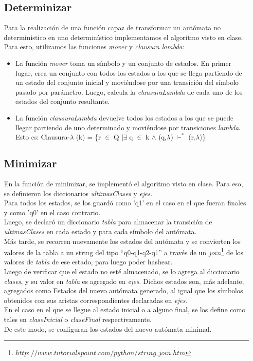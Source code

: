 \documentclass[a4paper, 10pt, twoside]{article}
\begin{document}
\subsection{Determinizar}
Para la realización de una función capaz de transformar un autómata no determinístico en uno determinístico implementamos el algoritmo visto en clase. Para esto, utilizamos las funciones \textit{mover} y \textit{clausura lambda}:
\begin{itemize}
\item La función \textit{mover} toma un símbolo y un conjunto de estados. En primer lugar, crea un conjunto con todos los estados a los que se llega partiendo de un estado del conjunto inicial y moviéndose por una transición del símbolo pasado por parámetro. Luego, calcula la \textit{clausuraLambda} de cada uno de los estados del conjunto resultante.
\item La función \textit{clausuraLambda} devuelve todos los estados a los que se puede llegar partiendo de uno determinado y moviéndose por transiciones \textit{lambda}. Esto es:
Clausura-$\lambda$ (k) = \{r $\in$ Q $| \exists$ q $\in$ k $\land$ (q,$\lambda$) $\vdash^{*}$ (r,$\lambda$)\}
\end{itemize}

\subsection{Minimizar}
En la función de minimizar, se implementó el algoritmo visto en clase. Para eso, se definieron los diccionarios \textit{ultimasClases} y \textit{ejes}.\\
\newline
Para todos los estados, se los guardó como 'q1' en el caso en el que fueran finales y como 'q0' en el caso contrario.\\
Luego, se declaró un diccionario \textit{tabla} para almacenar la transición de \textit{ultimasClases} en cada estado y para cada símbolo del autómata.\\
\newline
Más tarde, se recorren nuevamente los estados del autómata y se convierten los valores de la tabla a un string del tipo ``q0-q1-q2-q1'' a través de un $join$\footnote{$http://www.tutorialspoint.com/python/string\_join.htm$} de los valores de \textit{tabla} de ese estado, para luego poder hashear.\\
\newline
Luego de verificar que el estado no esté almacenado, se lo agrega al diccionario \textit{clases}, y su valor en \textit{tabla} es agregado en \textit{ejes}. Dichos estados son, más adelante, agregados como Estados del nuevo autómata generado, al igual que los símbolos obtenidos con sus aristas correspondientes declaradas en \textit{ejes}.\\
\newline
En el caso en el que se llegue al estado inicial o a alguno final, se los define como tales en \textit{claseInicial} o \textit{claseFinal} respectivamente.\\
\newline
De este modo, se configuran los estados del nuevo autómata minimal.
\end{document}
